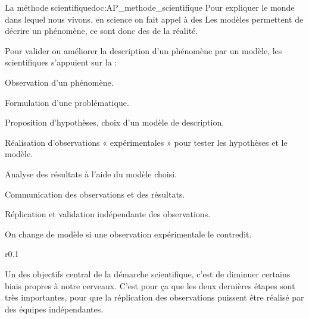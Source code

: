 \begin{doc}{La méthode scientifique}{doc:AP_methode_scientifique}
  Pour expliquer le monde dans lequel nous vivons, en science on fait appel à des  
  Les modèles permettent de décrire un phénomène, ce sont donc des  de la réalité.

  Pour valider ou améliorer la description d'un phénomène par un modèle, les scientifiques s'appuient sur la  :
  \begin{enumeration}
    \item Observation d'un phénomène.
    \item Formulation d'une problématique.
    \item Proposition d'hypothèses, choix d'un modèle de description.
    \item Réalisation d'observations « expérimentales » pour tester les hypothèses et le modèle.
    \item Analyse des résultats à l'aide du modèle choisi.
    \item Communication des observations et des résultats.
    \item Réplication et validation indépendante des observations.
  \end{enumeration}

  \flecheLongue On change de modèle si une observation expérimentale le contredit.
  \bigskip


  \begin{wrapfigure}{r}{0.1\linewidth}
    \vspace*{-18pt}
  \end{wrapfigure}
  Un des objectifs central de la démarche scientifique, c'est de diminuer certains biais propres à notre cerveaux.
  C'est pour ça que les deux dernières étapes sont très importantes, pour que la réplication des observations puissent être réalisé par des équipes indépendantes.
\end{doc}


